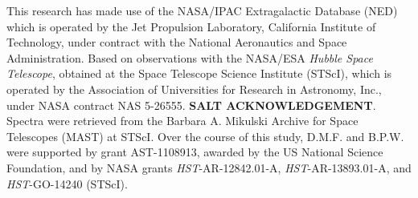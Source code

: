 \documentclass[iop]{emulateapj-rtx4}
\begin{document}
\acknowledgements

This research has made use of the NASA/IPAC Extragalactic Database (NED) which is operated by the Jet Propulsion Laboratory, California Institute of Technology, under contract with the National Aeronautics and Space Administration. Based on observations with the NASA/ESA \textit{Hubble Space Telescope}, obtained at the Space Telescope Science Institute (STScI), which is operated by the Association of Universities for Research in Astronomy, Inc., under NASA contract NAS 5-26555. \textbf{SALT ACKNOWLEDGEMENT}. Spectra were retrieved from the Barbara A. Mikulski Archive for Space Telescopes (MAST) at STScI. Over the course of this study, D.M.F. and B.P.W. were supported by grant AST-1108913, awarded by the US National Science Foundation, and by NASA grants \textit{HST}-AR-12842.01-A, \textit{HST}-AR-13893.01-A, and \textit{HST}-GO-14240 (STScI). 



\nocite{*}


\end{document}
